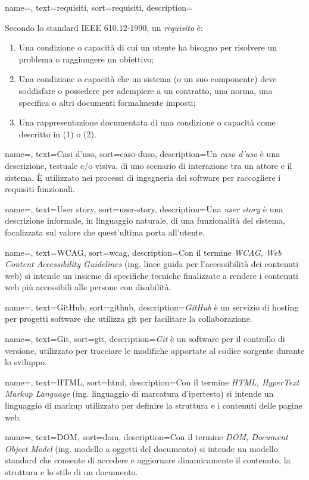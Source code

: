  {
    name=,
    text=requisiti,
    sort=requisiti,
    description={Secondo lo standard IEEE 610.12-1990, un \emph{requisito} è:
    \begin{enumerate}
        \item Una condizione o capacità di cui un utente ha bisogno per risolvere un problema o raggiungere un obiettivo;
        \item Una condizione o capacità che un sistema (o un suo componente) deve soddisfare o possedere per adempiere a un contratto, una norma, una specifica o altri documenti formalmente imposti;
        \item Una rappresentazione documentata di una condizione o capacità come descritto in (1) o (2).
    \end{enumerate}
    }
}

 {
    name=,
    text=Casi d'uso,
    sort=caso-duso,
    description={Un \emph{caso d'uso} è una descrizione, testuale e/o visiva, di uno scenario di interazione tra un attore e il sistema. È utilizzato nei processi di ingegneria del software per raccogliere i requisiti funzionali.}
}

 {
    name=,
    text=User story,
    sort=user-story,
    description={Una \emph{user story} è una descrizione informale, in linguaggio naturale, di una funzionalità del sistema, focalizzata sul valore che quest'ultima porta all'utente.}
}

 {
    name=,
    text=WCAG,
    sort=wcag,
    description={Con il termine \emph{WCAG, Web Content Accessibility Guidelines} (ing. linee guida per l'accessibilità dei contenuti web) si intende un insieme di specifiche tecniche finalizzate a rendere i contenuti web più accessibili alle persone con disabilità.}
}

 {
    name=,
    text=GitHub,
    sort=github,
    description={\emph{GitHub} è un servizio di hosting per progetti software che utilizza \gls{git} per facilitare la collaborazione.}
}

 {
    name=,
    text=Git,
    sort=git,
    description={\emph{Git} è un software per il controllo di versione, utilizzato per tracciare le modifiche apportate al codice sorgente durante lo sviluppo.}
}

 {
    name=,
    text=HTML,
    sort=html,
    description={Con il termine \emph{HTML, HyperText Markup Language} (ing. linguaggio di marcatura d'ipertesto) si intende un linguaggio di markup utilizzato per definire la struttura e i contenuti delle pagine web.}
}

 {
    name=,
    text=DOM,
    sort=dom,
    description={Con il termine \emph{DOM, Document Object Model} (ing. modello a oggetti del documento) si intende un modello standard che consente di accedere e aggiornare dinamicamente il contenuto, la struttura e lo stile di un documento.}
}

